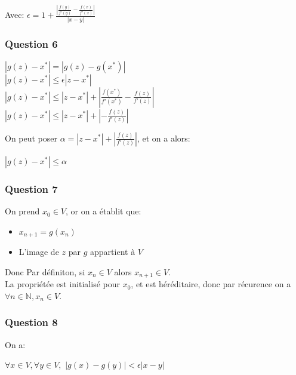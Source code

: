 \documentclass{article}
\begin{document}
	Avec: $\epsilon = 1 + \frac{|\frac{f(y)}{f'(y)}-\frac{f(x)}{f'(x)}|}{|x-y|}$
	
	\subsubsection{Question 6}
	
	\begin{center}
		\begin{large}
			$|g(z)-x^{*}| = |g(z)-g(x^{*})|$\\
			$|g(z)-x^{*}| \le \epsilon|z-x^{*}|$\\
			$|g(z)-x^{*}| \le |z-x^{*}|+|\frac{f(x^{*})}{f'(x^{*})}-\frac{f(z)}{f'(z)}|$\\
			$|g(z)-x^{*}| \le |z-x^{*}|+|-\frac{f(z)}{f'(z)}|$\\
		\end{large}
	\end{center}
	
	On peut poser $\alpha = |z-x^{*}|+|\frac{f(z)}{f'(z)}|$, et on a alors:
	
	\begin{center}
		\begin{large}
			$|g(z)-x^{*}| \le \alpha$
		\end{large}
	\end{center}
	
	\subsubsection{Question 7}
	
	On prend $x_{0} \in V$, or on a établit que:
	\begin{itemize}
		\item $x_{n+1}=g(x_{n})$
		\item L'image de $z$ par $g$ appartient à $V$
	\end{itemize}
	
	Donc Par définiton, si $x_{n} \in V$ alors $x_{n+1} \in V$.\\
	
	La propriétée est initialisé pour $x_{0}$, et est héréditaire, donc par récurence on a $\forall n \in \mathbb{N}, x_{n} \in V$.
	
	\subsubsection{Question 8}
	
	On a:
	
	\begin{center}
		\begin{large}
			$\forall x \in V, \forall y \in V,$
			$|g(x)-g(y)| < \epsilon|x-y|$	
		\end{large}
	\end{center}
\end{document}
